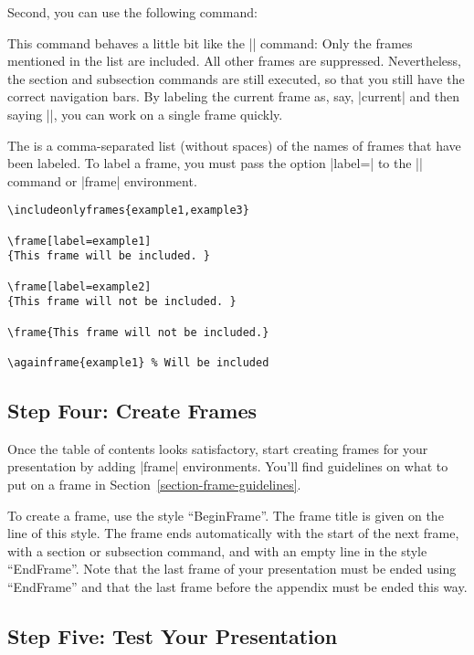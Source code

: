 Second, you can use the following command:

\begin{command}{{}}
  This command behaves a little bit like the || command: Only the frames mentioned in the list are included. All other frames are suppressed. Nevertheless, the section and subsection commands are still executed, so that you still have the correct navigation bars. By labeling the current frame as, say, |current| and then saying ||, you can work on a single frame quickly.

  The  is a comma-separated list (without spaces) of the names of frames that have been labeled. To label a frame, you must pass the option |label=| to the |\frame| command or |frame| environment.

  \example
\begin{verbatim}
\includeonlyframes{example1,example3}

\frame[label=example1]
{This frame will be included. }

\frame[label=example2]
{This frame will not be included. }

\frame{This frame will not be included.}

\againframe{example1} % Will be included
\end{verbatim}
\end{command}


\subsection{Step Four: Create Frames}

Once the table of contents looks satisfactory, start creating frames for your presentation by adding |frame| environments. You'll find guidelines on what to put on a frame in Section~\ref{section-frame-guidelines}.

\lyxnote
To create a frame, use the style ``BeginFrame''. The frame title is given on the line of this style. The frame ends automatically with the start of the next frame, with a section or subsection command, and with an empty line in the style ``EndFrame''. Note that the last frame of your presentation must be ended using ``EndFrame'' and that the last frame before the appendix must be ended this way.


\subsection{Step Five: Test Your Presentation}


